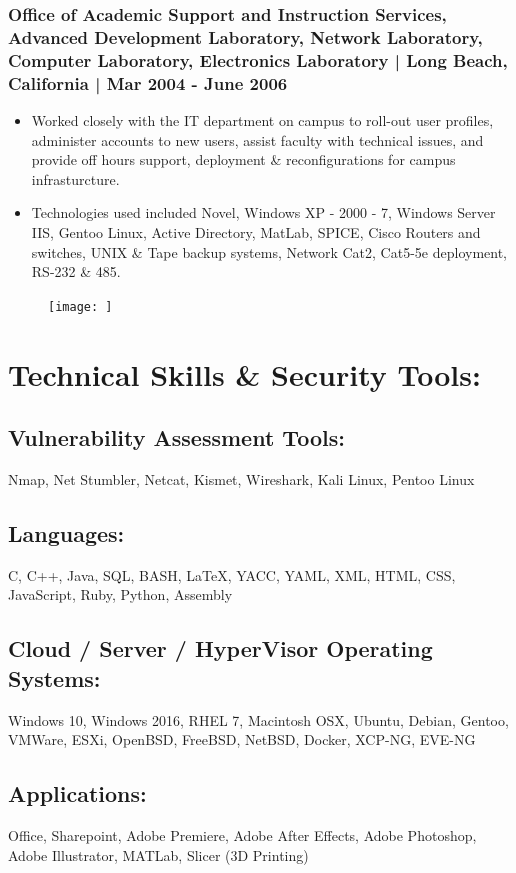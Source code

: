\documentclass[letter,10pt]{article}
\begin{document}
\subsubsection*{Office of Academic Support and Instruction Services, Advanced Development Laboratory, Network Laboratory, Computer Laboratory, Electronics Laboratory | Long Beach, California | Mar 2004 - June 2006}
\label{sec:org0508d17}
\begin{itemize}
\item Worked closely with the IT department on campus to roll-out user profiles, administer accounts to new users, assist faculty with technical issues, and provide off hours support, deployment \& reconfigurations for campus infrasturcture.
\item Technologies used included Novel, Windows XP - 2000 - 7, Windows Server IIS, Gentoo Linux, Active Directory, MatLab, SPICE, Cisco Routers and switches, UNIX \& Tape backup systems, Network Cat2, Cat5-5e deployment, RS-232 \& 485.
\end{itemize}
\begin{figure}
\texttt{[image: ]}
\end{figure}

\section*{Technical Skills \& Security Tools:}
\label{sec:org12554f7}
\subsection*{Vulnerability Assessment Tools:}
\label{sec:org6d1070b}
Nmap, Net Stumbler, Netcat, Kismet, Wireshark, Kali Linux, Pentoo Linux
\subsection*{Languages:}
\label{sec:org33d30e9}
C, C++, Java, SQL, BASH, \LaTeX{}, YACC, YAML, XML, HTML, CSS, JavaScript, Ruby, Python, Assembly
\subsection*{Cloud / Server / HyperVisor Operating Systems:}
\label{sec:orgc1bff19}
Windows 10, Windows 2016, RHEL 7, Macintosh OSX, Ubuntu, Debian, Gentoo, VMWare, ESXi, OpenBSD, FreeBSD, NetBSD, Docker, XCP-NG, EVE-NG
\subsection*{Applications:}
\label{sec:org685a79b}
Office, Sharepoint, Adobe Premiere, Adobe After Effects, Adobe Photoshop, Adobe Illustrator, MATLab, Slicer (3D Printing)
\end{document}

